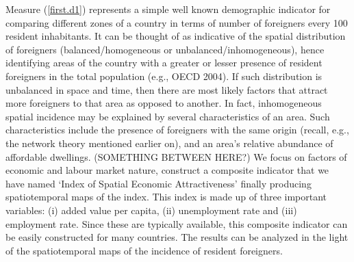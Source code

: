 \documentclass[10pt] {article}
\theoremstyle{definition}
\theoremstyle{plain}
\begin{document}
Measure (\ref{first.d1}) represents a simple well known demographic indicator for comparing different zones of a country in terms of number of foreigners every 100 resident inhabitants. It can be thought of as indicative of the spatial distribution of foreigners (balanced/homogeneous or unbalanced/inhomogeneous), hence identifying areas of the country with a greater or lesser presence of resident foreigners in the total population (e.g., OECD 2004). If such distribution is unbalanced in space and time, then there are most likely factors that attract more foreigners to that area as opposed to another. In fact, inhomogeneous spatial incidence may be explained by several characteristics of an area. Such characteristics include the presence of foreigners with the same origin (recall, e.g., the network theory mentioned earlier on), and an area's relative abundance of affordable dwellings. (SOMETHING BETWEEN HERE?) We focus on factors of economic and labour market nature, construct a composite indicator that we have named `Index of Spatial Economic Attractiveness' finally producing spatiotemporal maps of the index. This index is made up of three important variables: (i) added value per capita, (ii) unemployment rate and (iii) employment rate. Since these are typically available, this composite indicator can be easily constructed for many countries. The results can be analyzed in the light of the spatiotemporal maps of the incidence of resident foreigners.
\end{document}
